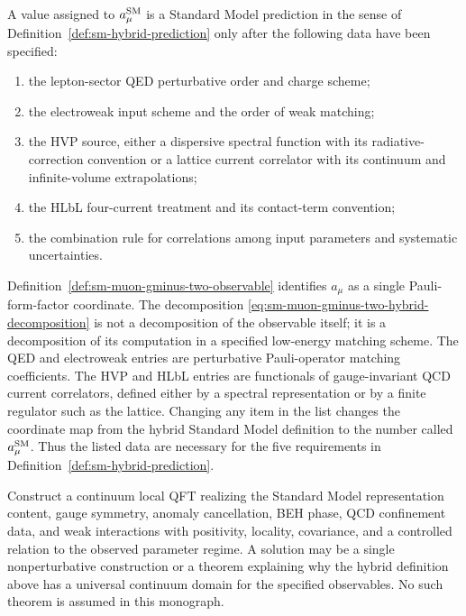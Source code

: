 \begin{remark}
\label{rem:sm-muon-gminus-two-prediction-inputs}
A value assigned to \(a_\mu^{\rm SM}\) is a Standard Model prediction in the
sense of Definition~\ref{def:sm-hybrid-prediction} only after the following
data have been specified:
\begin{enumerate}
\item the lepton-sector QED perturbative order and charge scheme;
\item the electroweak input scheme and the order of weak matching;
\item the HVP source, either a dispersive spectral function with its
      radiative-correction convention or a lattice current correlator with its
      continuum and infinite-volume extrapolations;
\item the HLbL four-current treatment and its contact-term convention;
\item the combination rule for correlations among input parameters and
      systematic uncertainties.
\end{enumerate}
Definition~\ref{def:sm-muon-gminus-two-observable} identifies \(a_\mu\) as a
single Pauli-form-factor coordinate.  The decomposition
\eqref{eq:sm-muon-gminus-two-hybrid-decomposition} is not a decomposition of
the observable itself; it is a decomposition of its computation in a specified
low-energy matching scheme.  The QED and electroweak entries are perturbative
Pauli-operator
matching coefficients.  The HVP and HLbL entries are functionals of
gauge-invariant QCD current correlators, defined either by a spectral
representation or by a finite regulator such as the lattice.  Changing any
item in the list changes the coordinate map from the hybrid Standard Model
definition to the number called \(a_\mu^{\rm SM}\).  Thus the listed data are
necessary for the five requirements in
Definition~\ref{def:sm-hybrid-prediction}.
\end{remark}

\begin{openproblem}
\label{op:constructive-standard-model}
Construct a continuum local QFT realizing the Standard Model representation
content, gauge symmetry, anomaly cancellation, BEH phase, QCD confinement
data, and weak interactions with positivity, locality, covariance, and a
controlled relation to the observed parameter regime.  A solution may be a
single nonperturbative construction or a theorem explaining why the hybrid
definition above has a universal continuum domain for the specified
observables.
No such theorem is assumed in this monograph.
\end{openproblem}
